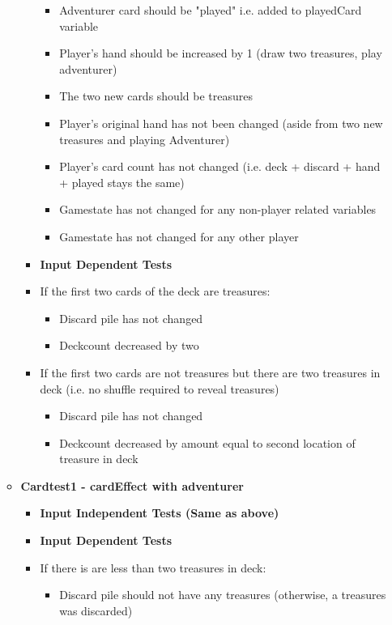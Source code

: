 \documentclass[11pt,letterpaper]{article}
\begin{document}
\begin{enumerate}[label=\Roman*.]
\begin{itemize}[leftmargin=*]
\begin{itemize}[leftmargin=*, label={}]
            \begin{itemize}[leftmargin=*]
              \item Adventurer card should be "played" i.e. added to playedCard variable
              \item Player's hand should be increased by 1 (draw two treasures, play adventurer)
              \item The two new cards should be treasures
              \item Player's original hand has not been changed (aside from two new treasures and playing Adventurer)
              \item Player's card count has not changed (i.e. deck + discard + hand + played stays the same)
              \item Gamestate has not changed for any non-player related variables
              \item Gamestate has not changed for any other player
            \end{itemize}

          \item \textbf{Input Dependent Tests}
          \item If the first two cards of the deck are treasures: 
            \begin{itemize}[leftmargin=*]
              \item Discard pile has not changed
              \item Deckcount decreased by two
            \end{itemize}
          \item If the first two cards are not treasures but there are two treasures in deck (i.e. no shuffle required to reveal treasures)
            \begin{itemize}[leftmargin=*]
              \item Discard pile has not changed
              \item Deckcount decreased by amount equal to second location of treasure in deck
            \end{itemize}
        \end{itemize}

      \item \textbf{Cardtest1 - cardEffect with adventurer}
        \begin{itemize}[leftmargin=*, label={}]
          \item \textbf{Input Independent Tests (Same as above)}
          \item \textbf{Input Dependent Tests}
          \item If there is are less than two treasures in deck:
            \begin{itemize}[leftmargin=*]
              \item Discard pile should not have any treasures (otherwise, a treasures was discarded)
            \end{itemize}
        \end{itemize}


\end{itemize}
\end{enumerate}
\end{document}
